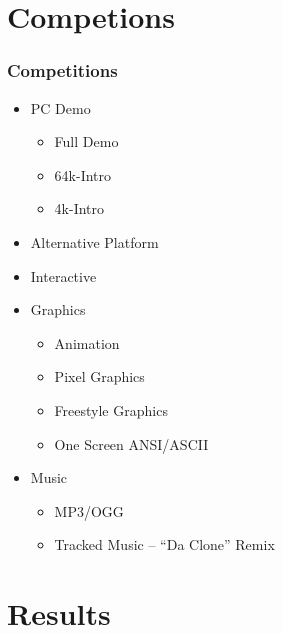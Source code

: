 \documentclass{beamer}
\begin{document}
\section{Competions}

\begin{frame}
  \frametitle{Competitions}
  \begin{itemize}
  \item PC Demo
    \begin{itemize}
    \item Full Demo
    \item 64k-Intro
    \item 4k-Intro
    \end{itemize}
  \item Alternative Platform
  \item Interactive
  \item Graphics
    \begin{itemize}
    \item Animation
    \item Pixel Graphics
    \item Freestyle Graphics
    \item One Screen ANSI/ASCII
    \end{itemize}
  \item Music
    \begin{itemize}
    \item MP3/OGG
    \item Tracked Music -- ``Da Clone'' Remix
    \end{itemize}
  \end{itemize}
\end{frame}


\section{Results}
\end{document}
